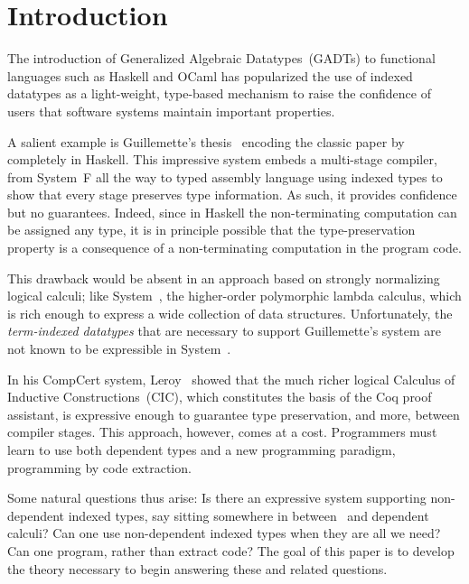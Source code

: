 \section{Introduction}
\label{sec:intro}


The introduction of Generalized Algebraic Datatypes~(GADTs) to
functional languages such as Haskell and OCaml has popularized
the use of indexed datatypes as a light-weight, type-based mechanism
to raise the confidence of users that software systems maintain important
properties.  

A salient example is Guillemette's thesis~\cite{guillemetteThesis}
encoding the classic paper by~\citet{tal-toplas} completely
in Haskell. This impressive system embeds a multi-stage compiler, from
System~F all the way to typed assembly language using indexed types to
show that every stage preserves type information.
%
As such, it provides confidence but no guarantees.  Indeed, since in
Haskell the non-terminating computation can be assigned any type, it is in
principle possible that the type-preservation property is a consequence of
a non-terminating computation in the program code.

This drawback would be absent in an approach based on strongly normalizing
logical calculi; like System~\Fw, the higher-order
polymorphic lambda calculus, which is rich enough to express a wide
collection of data structures.  Unfortunately, the \emph{term-indexed
datatypes} that are necessary to support Guillemette's system are not
known to be expressible in System~\Fw.

In his CompCert system, Leroy~\cite{Leroy-Compcert-CACM} showed that the
much richer logical Calculus of Inductive Constructions~(CIC), which
constitutes the basis of the Coq proof assistant, is expressive enough to
guarantee type preservation, and more, between compiler stages.  This
approach, however, comes at a cost.  Programmers must learn to use both
dependent types and a new programming paradigm, programming by code
extraction.

Some natural questions thus arise: Is there an expressive system
supporting non-dependent indexed types, say sitting somewhere in between
\Fw\ and dependent calculi?  
Can one use non-dependent indexed types when they are all we
need?
Can one program, rather than extract code? 
The goal of this paper is to develop the theory necessary to begin
answering these and related questions.  

